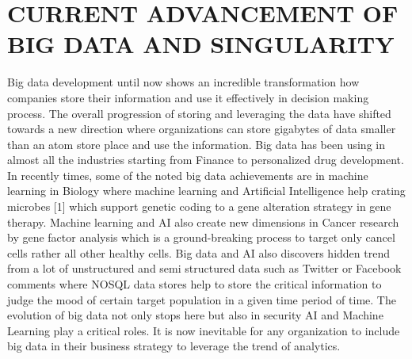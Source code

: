 \documentclass[sigconf]{acmart}
\begin{document}
\section{CURRENT ADVANCEMENT OF BIG DATA AND  SINGULARITY }
Big data development until now shows an incredible transformation how companies store their information and use it effectively in decision making process. The overall progression of storing and leveraging the data have shifted towards a new direction where organizations can store gigabytes of data smaller than an atom store place and use the information. Big data has been using in almost all the industries starting from Finance to personalized drug development. In recently times, some of the noted big data achievements are in machine learning in Biology where machine learning and Artificial Intelligence help crating microbes [1] which support genetic coding to a gene alteration strategy in gene therapy. Machine learning and AI also create new dimensions in Cancer research by gene factor analysis which is a ground-breaking process to target only cancel cells rather all other healthy cells. Big data and AI also discovers hidden trend from a lot of unstructured and semi structured data such as Twitter or Facebook comments where NOSQL data stores help to store the critical information to judge the mood of certain target population in a given time period of time. The evolution of big data not only stops here but also in security AI and Machine Learning play a critical roles. It is now inevitable for any organization to include big data in their business strategy to leverage the trend of analytics.
\end{document}

